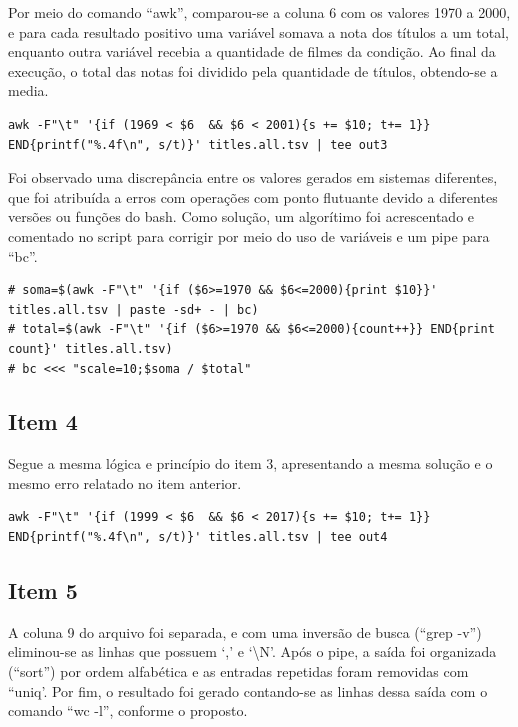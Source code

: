 \documentclass[12pt]{article}
\begin{document}
Por meio do comando ``awk'', comparou-se a coluna 6 com os valores 1970 a 2000, e para cada resultado positivo uma variável somava a nota dos títulos a um total, enquanto outra variável recebia a quantidade de filmes da condição. Ao final da execução, o total das notas foi dividido pela quantidade de títulos, obtendo-se a media.

\begin{verbatim}
awk -F"\t" '{if (1969 < $6  && $6 < 2001){s += $10; t+= 1}} END{printf("%.4f\n", s/t)}' titles.all.tsv | tee out3
\end{verbatim}

Foi observado uma discrepância entre os valores gerados em sistemas diferentes, que foi atribuída a erros com operações com ponto flutuante devido a diferentes versões ou funções do bash. Como solução, um algorítimo foi acrescentado e comentado no script para corrigir por meio do uso de variáveis e um pipe para ``bc''.

\begin{verbatim}
# soma=$(awk -F"\t" '{if ($6>=1970 && $6<=2000){print $10}}' titles.all.tsv | paste -sd+ - | bc) 
# total=$(awk -F"\t" '{if ($6>=1970 && $6<=2000){count++}} END{print count}' titles.all.tsv)
# bc <<< "scale=10;$soma / $total"
\end{verbatim}

\subsection*{Item 4}

Segue a mesma lógica e princípio do item 3, apresentando a mesma solução e o mesmo erro relatado no item anterior.

\begin{verbatim}
awk -F"\t" '{if (1999 < $6  && $6 < 2017){s += $10; t+= 1}} END{printf("%.4f\n", s/t)}' titles.all.tsv | tee out4
\end{verbatim}

\subsection*{Item 5}

A coluna 9 do arquivo foi separada, e com uma inversão de busca (``grep -v'') eliminou-se as linhas que possuem `,' e `\textbackslash	N'. Após o pipe, a saída foi organizada (``sort'') por ordem alfabética e as entradas repetidas foram removidas com ``uniq'. Por fim, o resultado foi gerado contando-se as linhas dessa saída com o comando ``wc -l'', conforme o proposto.
\end{document}
